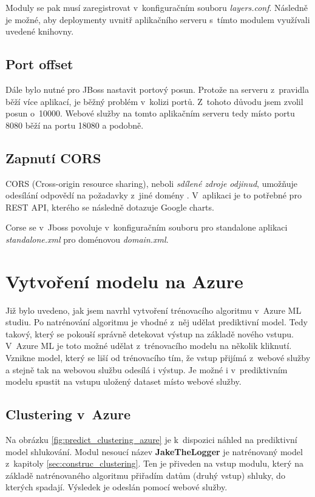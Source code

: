 \documentclass[thesis=M,czech]{FITthesis}[2012/10/20]
\begin{document}
		Moduly se pak musí zaregistrovat v~konfiguračním souboru \textit{layers.conf}. Následně je možné, aby deploymenty uvnitř aplikačního serveru s~tímto modulem využívali uvedené knihovny.
		
		\subsection{Port offset}
		\label{sec:port-offset}
		Dále bylo nutné pro JBoss nastavit portový posun. Protože na serveru z~pravidla běží více aplikací, je běžný problém v~kolizi portů. Z~tohoto důvodu jsem zvolil posun o~10000. Webové služby na tomto aplikačním serveru tedy místo portu 8080 běží na portu 18080 a podobně.
		
		\subsection{Zapnutí CORS}
		CORS (Cross-origin resource sharing), neboli \textit{sdílené zdroje odjinud}, umožňuje odesílání odpovědí na požadavky z~jiné domény \cite{CORS}. V~aplikaci je to potřebné pro REST API, kterého se následně dotazuje Google charts.
		
		Corse se v~Jboss povoluje v~konfiguračním souboru pro standalone aplikaci \textit{standalone.xml} pro doménovou \textit{domain.xml}.
		
	
	\section{Vytvoření modelu na Azure}
		Již bylo uvedeno, jak jsem navrhl vytvoření trénovacího algoritmu v~Azure ML studiu. Po natrénování algoritmu je vhodné z~něj udělat prediktivní model. Tedy takový, který se pokouší správně detekovat výstup na základě nového vstupu. V~Azure ML je toto možné udělat z~trénovacího modelu na několik kliknutí. Vznikne model, který se liší od trénovacího tím, že vstup přijímá z~webové služby a stejně tak na webovou službu odesílá i výstup. Je možné i v~prediktivním modelu spustit na vstupu uložený dataset místo webové služby.
		
		\subsection{Clustering v~Azure}
			Na obrázku \ref{fig:predict_clustering_azure} je k~dispozici náhled na prediktivní model shlukování. Modul nesoucí název \textbf{JakeTheLogger} je natrénovaný model z~kapitoly \ref{sec:construc_clustering}. Ten je přiveden na vstup modulu, který na základě natrénovaného algoritmu přiřadím datům (druhý vstup) shluky, do kterých spadají. Výsledek je odeslán pomocí webové služby. 
			
\end{document}

